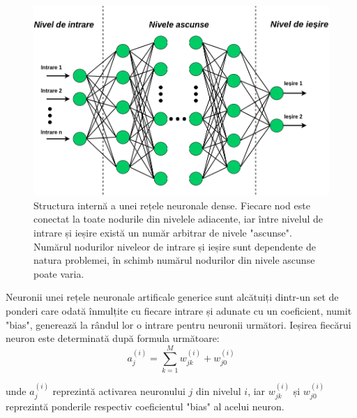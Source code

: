 \documentclass[a4paper,12pt]{book}
\begin{document}
			\begin{figure}[t]
			\centering
			\hspace*{0,8cm}
			\includegraphics[scale=0.60]{nns}
			\caption{Structura internă a unei rețele neuronale dense. Fiecare nod este conectat la toate nodurile din nivelele adiacente, iar între nivelul de intrare și ieșire există un număr arbitrar de nivele "ascunse". Numărul nodurilor niveleor de intrare și ieșire sunt dependente de natura problemei, în schimb numărul nodurilor din nivele ascunse poate varia.} 
			\label{fig:nns}
			\end{figure}	
			
			Neuronii unei rețele neuronale artificale generice sunt alcătuiți dintr-un set de ponderi care odată înmulțite cu fiecare intrare și adunate cu un coeficient, numit "bias", generează la rândul lor o intrare pentru neuronii următori. 
			\noindent Ieșirea fiecărui neuron este determinată după formula următoare:
			\begin{equation}
					a_j^{(i)} = \sum_{k=1}^{M} w_{jk}^{(i)} + w_{j0}^{(i)}
			\end{equation}
			
			unde $a_j^{(i)}$ reprezintă activarea neuronului $j$ din nivelul $i$, iar $w_{jk}^{(i)}$ și $w_{j0}^{(i)}$ reprezintă ponderile respectiv coeficientul "bias" al acelui neuron. \par
			
\end{document}
